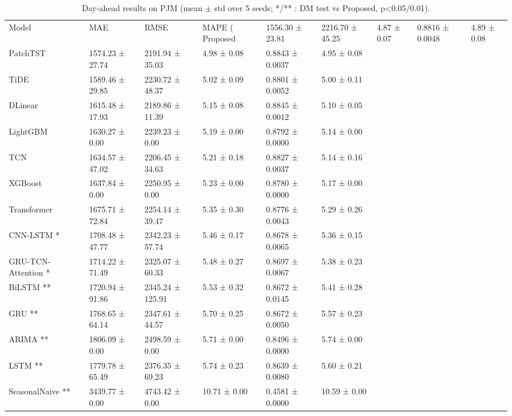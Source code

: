 \begin{table}
\caption{Day-ahead results on PJM (mean $\pm$ std over 5 seeds; */** : DM test vs Proposed, p<0.05/0.01).}
\label{tab:results_pjm}
\begin{tabular}{llllll}
\toprule
Model & MAE & RMSE & MAPE (%
\midrule
Proposed & 1556.30 ± 23.81 & 2216.70 ± 45.25 & 4.87 ± 0.07 & 0.8816 ± 0.0048 & 4.89 ± 0.08 \\
PatchTST & 1574.23 ± 27.74 & 2191.94 ± 35.03 & 4.98 ± 0.08 & 0.8843 ± 0.0037 & 4.95 ± 0.08 \\
TiDE & 1589.46 ± 29.85 & 2230.72 ± 48.37 & 5.02 ± 0.09 & 0.8801 ± 0.0052 & 5.00 ± 0.11 \\
DLinear & 1615.48 ± 17.93 & 2189.86 ± 11.39 & 5.15 ± 0.08 & 0.8845 ± 0.0012 & 5.10 ± 0.05 \\
LightGBM & 1630.27 ± 0.00 & 2239.23 ± 0.00 & 5.19 ± 0.00 & 0.8792 ± 0.0000 & 5.14 ± 0.00 \\
TCN & 1634.57 ± 47.02 & 2206.45 ± 34.63 & 5.21 ± 0.18 & 0.8827 ± 0.0037 & 5.14 ± 0.16 \\
XGBoost & 1637.84 ± 0.00 & 2250.95 ± 0.00 & 5.23 ± 0.00 & 0.8780 ± 0.0000 & 5.17 ± 0.00 \\
Transformer & 1675.71 ± 72.84 & 2254.14 ± 39.47 & 5.35 ± 0.30 & 0.8776 ± 0.0043 & 5.29 ± 0.26 \\
CNN-LSTM * & 1708.48 ± 47.77 & 2342.23 ± 57.74 & 5.46 ± 0.17 & 0.8678 ± 0.0065 & 5.36 ± 0.15 \\
GRU-TCN-Attention * & 1714.22 ± 71.49 & 2325.07 ± 60.33 & 5.48 ± 0.27 & 0.8697 ± 0.0067 & 5.38 ± 0.23 \\
BiLSTM ** & 1720.94 ± 91.86 & 2345.24 ± 125.91 & 5.53 ± 0.32 & 0.8672 ± 0.0145 & 5.41 ± 0.28 \\
GRU ** & 1768.65 ± 64.14 & 2347.61 ± 44.57 & 5.70 ± 0.25 & 0.8672 ± 0.0050 & 5.57 ± 0.23 \\
ARIMA ** & 1806.09 ± 0.00 & 2498.59 ± 0.00 & 5.71 ± 0.00 & 0.8496 ± 0.0000 & 5.74 ± 0.00 \\
LSTM ** & 1779.78 ± 65.49 & 2376.35 ± 69.23 & 5.74 ± 0.23 & 0.8639 ± 0.0080 & 5.60 ± 0.21 \\
SeasonalNaive ** & 3439.77 ± 0.00 & 4743.42 ± 0.00 & 10.71 ± 0.00 & 0.4581 ± 0.0000 & 10.59 ± 0.00 \\
\bottomrule
\end{tabular}
\end{table}
